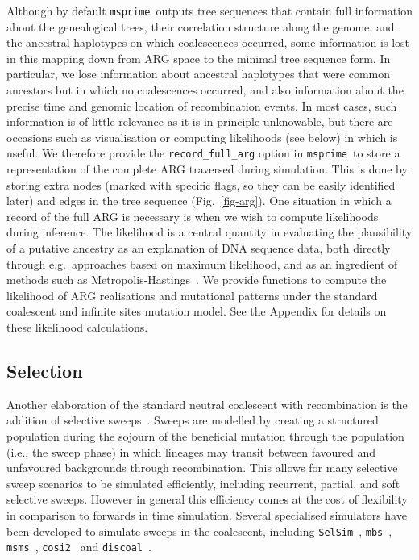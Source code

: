 \documentclass{article}
\newcommand{\msprime}[0]{\texttt{msprime}}
\newcommand{\msms}[0]{\texttt{msms}}
\newcommand{\cosiTwo}[0]{\texttt{cosi2}}
\newcommand{\discoal}[0]{\texttt{discoal}}
\begin{document}
Although by default \msprime\ outputs tree sequences that contain full information
about the genealogical trees, their correlation structure along the genome,
and the ancestral haplotypes on which coalescences occurred, some information
is lost in this mapping down from ARG space to the minimal tree sequence
form. In particular, we lose
information about ancestral haplotypes that were common ancestors but
in which no coalescences occurred, and also information about the precise time
and genomic location of recombination events. In most cases, such
information is of little relevance as it is in principle unknowable,
but there are occasions such as visualisation or computing likelihoods (see
below) in which is useful. We therefore provide
the \texttt{record\_full\_arg} option in \msprime\
to store a representation of the complete ARG traversed during simulation.
This is done by storing extra nodes (marked with specific flags, so they
can be easily identified later) and edges in the tree sequence
(Fig.~\ref{fig-arg}).
One situation in which a record of the full ARG is necessary is when we
wish to compute likelihoods during inference.
The likelihood is a central quantity in evaluating the plausibility of a putative
ancestry as an explanation of DNA sequence data, both directly through
e.g.~approaches based on maximum likelihood, and as an ingredient of
methods such as
Metropolis-Hastings~\citep{kuhner2000maximum,nielsen2000estimation,wang2008bayesian}.
We provide functions to compute the likelihood of ARG realisations
and mutational patterns under
the standard coalescent and infinite sites mutation model.
See the Appendix for details on these likelihood calculations.

\subsection*{Selection}
\label{sec-selection}
Another elaboration of the standard neutral coalescent with recombination
is the addition of selective
sweeps~\citep{kaplan1989hitchhiking,braverman1995hitchhiking,kim2002detecting}.
Sweeps are modelled by creating a structured population
during the sojourn of the beneficial mutation through the population (i.e., the sweep phase)
in which lineages may transit between favoured and unfavoured backgrounds through
recombination. This allows for many selective sweep scenarios to be simulated
efficiently, including recurrent, partial, and soft selective sweeps.
However in general this
efficiency comes at the cost of flexibility in comparison to forwards in
time simulation.
Several specialised simulators have been developed to simulate
sweeps in the coalescent,
including \texttt{SelSim}~\citep{spencer2004selsim},
\texttt{mbs}~\citep{teshima2009mbs}, \msms~\citep{ewing2010msms},
\cosiTwo~\citep{shlyakhter2014cosi2}
and \discoal~\citep{kern2016discoal}.
\end{document}
